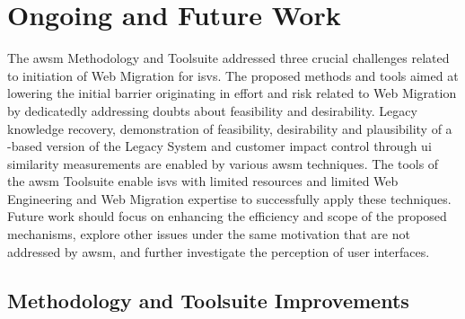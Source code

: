 \vspace{-15pt}
\hypertarget{ongoing-and-future-work}{%
\section{Ongoing and Future Work}\label{ongoing-and-future-work}}
\vspace{15pt}

The \gls{awsm} Methodology and Toolsuite addressed three crucial challenges related to initiation of \gls{Web Migration} for \glspl{isv}.
The proposed methods and tools aimed at lowering the initial barrier originating in effort and risk related to \gls{Web Migration} by dedicatedly addressing doubts about feasibility and desirability.
Legacy knowledge recovery, demonstration of feasibility, desirability and plausibility of a -based version of the \gls{Legacy System} and customer impact control through \gls{ui} similarity measurements are enabled by various \gls{awsm} techniques.
The tools of the \gls{awsm} Toolsuite enable \glspl{isv} with limited resources and limited \gls{Web Engineering} and \gls{Web Migration} expertise to successfully apply these techniques.
Future work should focus on enhancing the efficiency and scope of the proposed mechanisms, explore other issues under the same motivation that are not addressed by \gls{awsm}, and further investigate the perception of user interfaces.

\hypertarget{methodology-and-platform-improvements}{%
\subsection{Methodology and Toolsuite Improvements}\label{methodology-and-platform-improvements}}
\vspace{10pt}

